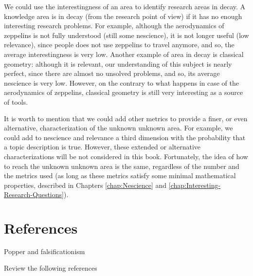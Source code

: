 \begin{example}
We could use the interestingness of an area to identify research areas in decay. A knowledge area is in decay (from the research point of view) if it has no enough interesting research problems. For example, although the aerodynamics of zeppelins is not fully understood (still some nescience), it is not longer useful (low relevance), since people does not use zeppelins to travel anymore, and so, the average interestingness is very low. Another example of area in decay is classical geometry: although it is relevant, our understanding of this subject is nearly perfect, since there are almost no unsolved problems, and so, its average nescience is very low. However, on the contrary to what happens in case of the aerodynamics of zeppelins, classical geometry is still very interesting as a source of tools.
\end{example}

It is worth to mention that we could add other metrics to provide a finer, or even alternative, characterization of the unknown unknown area. For example, we could add to nescience and relevance a third dimension with the probability that a topic description is true. However, these extended or alternative characterizations will be not considered in this book. Fortunately, the idea of how to reach the unknown unknown area is the same, regardless of the number and the metrics used (as long as these metrics satisfy some minimal mathematical properties, described in Chapters \ref{chap:Nescience} and \ref{chap:Interesting-Research-Questions}).

%
%

\section*{References}

Popper and falsificationism

{\color{red} Review the following references}

